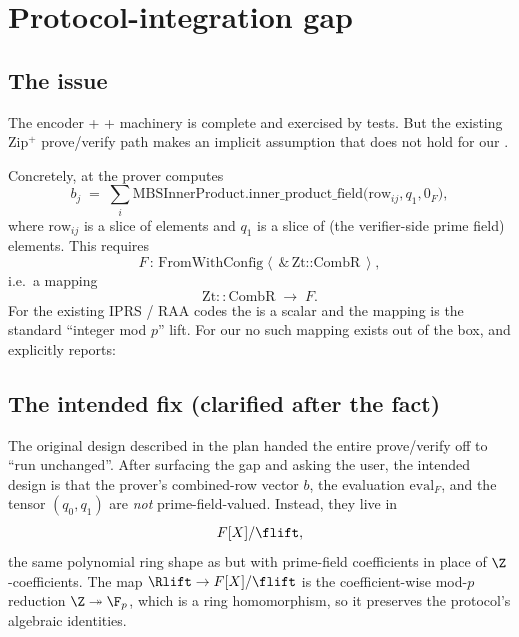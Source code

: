 \section{Protocol-integration gap}
\label{sec:protocol-gap}

\subsection{The issue}

The encoder +  +  machinery is
complete and exercised by tests. But the existing Zip$^+$
prove/verify path makes an implicit assumption that does not hold
for our .

Concretely, at  the prover computes
\[
  b_j \;=\; \sum_i \mathrm{MBSInnerProduct.inner\_product\_field}
            \bigl( \text{row}_{ij}, q_1, 0_F \bigr),
\]
where $\text{row}_{ij}$ is a slice of  elements
and $q_1$ is a slice of  (the verifier-side prime field)
elements. This requires
\[
  F \,:\, \mathrm{FromWithConfig}\!\left\langle\,
    \&\,\text{Zt::CombR}\,
  \right\rangle,
\]
i.e.\ a mapping
\[
  \mathrm{Zt::CombR} \;\longrightarrow\; F.
\]
For the existing IPRS / RAA codes the  is a scalar
 and the mapping is the standard ``integer mod $p$'' lift.
For our  no such mapping
exists out of the box, and  explicitly reports:

\begin{quote}\small
{}
\end{quote}

\subsection{The intended fix (clarified after the fact)}

The original design described in the plan handed the entire
prove/verify off to ``run unchanged''. After surfacing the gap and
asking the user, the intended design is that the prover's
combined-row vector $b$, the evaluation $\mathrm{eval}_F$, and the
tensor $(q_0, q_1)$ are \emph{not} prime-field-valued. Instead,
they live in
\[
  F[X]/\flift,
\]
the same polynomial ring shape as  but with prime-field
coefficients in place of $\Z$-coefficients. The map
$\Rlift \to F[X]/\flift$ is the coefficient-wise mod-$p$ reduction
$\Z \twoheadrightarrow \F_p$, which is a ring homomorphism, so it
preserves the protocol's algebraic identities.

